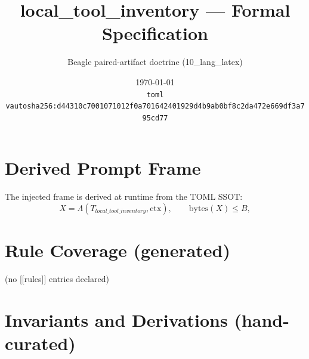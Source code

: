 \documentclass[11pt]{article}
\title{local\_tool\_inventory --- Formal Specification}
\author{Beagle paired-artifact doctrine (10\_lang\_latex)}
\date{\today\\ \texttt{toml vauto\quad sha256:d44310c7001071012f0a701642401929d4b9ab0bf8c2da472e669df3a795cd77}}
\begin{document}
\maketitle

\section{Derived Prompt Frame}
The injected frame is derived at runtime from the TOML SSOT:
\begin{equation}
  X = \Lambda(T_{local\_tool\_inventory}, \mathrm{ctx}), \qquad \mathrm{bytes}(X) \le B,
  \label{lbl:derive-frame}
\end{equation}

\section{Rule Coverage (generated)}
(no [[rules]] entries declared)

\section{Invariants and Derivations (hand-curated)}
\end{document}

